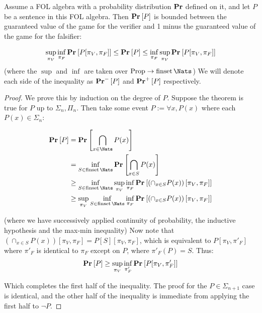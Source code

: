 \begin{theorem}
  Assume a FOL algebra with a probability distribution $\mathbf{Pr}$ defined on it, and let $P$ be a sentence in this FOL algebra. Then $\VFPAPERProb{P}$ is bounded between the guaranteed value of the game for the verifier and 1 minus the guaranteed value of the game for the falsifier:

  \begin{equation*}
    \sup_{\pi_V}\inf_{\pi_F}\VFPAPERProb{P[\pi_V,\pi_F]} \le
    \VFPAPERProb{P} \le
    \inf_{\pi_F}\sup_{\pi_V}\VFPAPERProb{P[\pi_V,\pi_F]}
  \end{equation*}
  (where the $\sup$ and $\inf$ are taken over $\Props\to\finset\Nats$) We will denote each side of the inequality as $\VFPAPERProb[-]{P}$ and $\VFPAPERProb[+]{P}$ respectively.
  \label{thm:supinf}
\end{theorem}
\begin{proof}
We prove this by induction on the degree of $P$. Suppose the theorem is true for $P$ up to $\Sigma_n,\Pi_n$. Then take some event $P:=\forall x, P(x)$ where each $P(x)\in\Sigma_n$:

\begin{align*}
  \VFPAPERProb{P}
  &=\VFPAPERProb{\bigcap_{x\in\Nats}P(x)}\\
  &=\inf_{S\in\finset\Nats}\VFPAPERProb{\bigcap_{x\in S}{P(x)}}\\
  &\ge
  \inf_{S\in\finset\Nats}
    \sup_{\pi_V}\inf_{\pi_F}\VFPAPERProb{
      \left(\cap_{x\in S}{P(x)}\right)[\pi_V,\pi_F]
    }\\
  &\ge \sup_{\pi_V}\inf_{S\in\finset\Nats}\inf_{\pi_F}\VFPAPERProb{
    \left(\cap_{x\in S}{P(x)}\right)[\pi_V,\pi_F]
  }\\
\end{align*}

(where we have successively applied continuity of probability, the inductive hypothesis and the max-min inequality) Now note that $\left(\cap_{x\in S}{P(x)}\right)[\pi_V,\pi_F]=P[S][\pi_V,\pi_F]$, which is equivalent to $P[\pi_V,\pi'_F]$ where $\pi'_F$ is identical to $\pi_F$ except on $P$, where $\pi'_F(P)=S$. Thus:
\begin{equation*}
  \VFPAPERProb{P}\ge \sup_{\pi_V}\inf_{\pi'_F}\VFPAPERProb{
    P[\pi_V,\pi'_F]
  }
\end{equation*}

Which completes the first half of the inequality. The proof for the $P\in\Sigma_{n+1}$ case is identical, and the other half of the inequality is immediate from applying the first half to $\lnot P$.

\end{proof}

